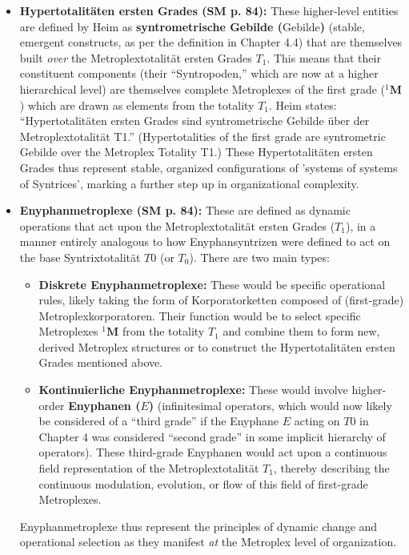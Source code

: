 \documentclass[12pt]{article}
\newcommand{\q}[1]{\enquote{#1}}
\newcommand{\syntrixtotalitaet}{T0}
\newcommand{\enyphane}{E}
\newcommand{\syntrometrischesGebilde}{\text{Gebilde}}
\newcommand{\metroplex}[1]{{}^{#1}\mathbf{M}}
\newcommand{\hypersyntrix}{\metroplex{1}}
\newcommand{\metroplextotalitaet}[1]{T_{#1}}
\begin{document}
\begin{itemize}
    \item \textbf{Hypertotalitäten ersten Grades (SM p. 84):}
    These higher-level entities are defined by Heim as \textbf{syntrometrische Gebilde (\(\syntrometrischesGebilde\))} (stable, emergent constructs, as per the definition in Chapter 4.4) that are themselves built \textit{over} the Metroplextotalität ersten Grades \( \metroplextotalitaet{1} \). This means that their constituent components (their \q{Syntropoden,} which are now at a higher hierarchical level) are themselves complete Metroplexes of the first grade (\( \hypersyntrix \)) which are drawn as elements from the totality \( \metroplextotalitaet{1} \). Heim states: \q{Hypertotalitäten ersten Grades sind syntrometrische Gebilde über der Metroplextotalität T1.} (Hypertotalities of the first grade are syntrometric Gebilde over the Metroplex Totality T1.) These Hypertotalitäten ersten Grades thus represent stable, organized configurations of 'systems of systems of Syntrices', marking a further step up in organizational complexity.

    \item \textbf{Enyphanmetroplexe (SM p. 84):}
    These are defined as dynamic operations that act upon the Metroplextotalität ersten Grades (\( \metroplextotalitaet{1} \)), in a manner entirely analogous to how Enyphansyntrizen were defined to act on the base Syntrixtotalität \( \syntrixtotalitaet \) (or \(T_0\)). There are two main types:
    \begin{itemize}
        \item \textbf{Diskrete Enyphanmetroplexe:} These would be specific operational rules, likely taking the form of Korporatorketten composed of (first-grade) Metroplexkorporatoren. Their function would be to select specific Metroplexes \( \hypersyntrix \) from the totality \( \metroplextotalitaet{1} \) and combine them to form new, derived Metroplex structures or to construct the Hypertotalitäten ersten Grades mentioned above.
        \item \textbf{Kontinuierliche Enyphanmetroplexe:} These would involve higher-order \textbf{Enyphanen (\(\enyphane\))} (infinitesimal operators, which would now likely be considered of a \q{third grade} if the Enyphane \( \enyphane \) acting on \( \syntrixtotalitaet \) in Chapter 4 was considered \q{second grade} in some implicit hierarchy of operators). These third-grade Enyphanen would act upon a continuous field representation of the Metroplextotalität \( \metroplextotalitaet{1} \), thereby describing the continuous modulation, evolution, or flow of this field of first-grade Metroplexes.
    \end{itemize}
    Enyphanmetroplexe thus represent the principles of dynamic change and operational selection as they manifest \textit{at} the Metroplex level of organization.


\end{itemize}
\end{document}
